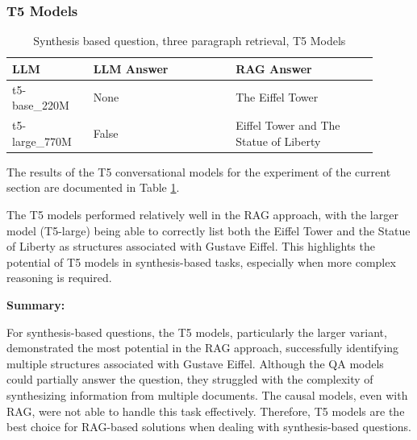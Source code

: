 \documentclass{wseas}
\begin{document}
\subsubsection{T5 Models}

\begin{table}[htbp]
  \centering
  \caption{Synthesis based question, three paragraph retrieval, T5 Models} %
  \label{tab:experiment_R_3_paragraph_Q_synthesis_M_T5Models_table}  %
  \begin{tabular}{|p{0.20\linewidth}|p{0.35\linewidth}|p{0.35\linewidth}|}
    \hline
    \textbf{LLM} & \textbf{LLM Answer} & \textbf{RAG Answer} \\
    \hline
    t5-base\_220M & None & The Eiffel Tower \\
    \hline
    t5-large\_770M & False & Eiffel Tower and The Statue of Liberty \\
    \hline
  \end{tabular}
\end{table}

The results of the T5 conversational models for the experiment of the current section
are documented in Table \ref{tab:experiment_R_3_paragraph_Q_synthesis_M_T5Models_table}.

The T5 models performed relatively well in the RAG approach, with the
larger model (T5-large) being able to correctly list both the Eiffel
Tower and the Statue of Liberty as structures associated with Gustave
Eiffel. This highlights the potential of T5 models in synthesis-based
tasks, especially when more complex reasoning is required.

\textbf{Summary:}

For synthesis-based questions, the T5 models, particularly the larger
variant, demonstrated the most potential in the RAG approach,
successfully identifying multiple structures associated with Gustave
Eiffel. Although the QA models could partially answer the question, they
struggled with the complexity of synthesizing information from multiple
documents. The causal models, even with RAG, were not able to handle
this task effectively. Therefore, T5 models are the best choice for
RAG-based solutions when dealing with synthesis-based questions.
\end{document}
